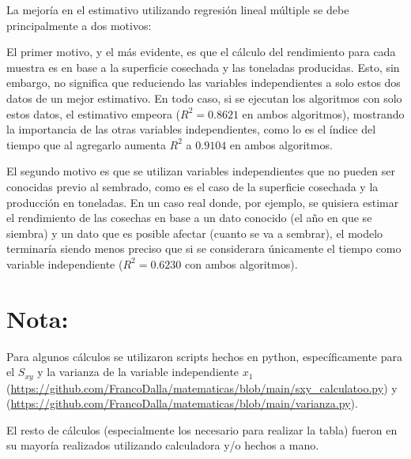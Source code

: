 \documentclass[spanish,12pt,a4paper]{article}
\begin{document}
\begin{enumerate}[label=\alph*)]
		La mejoría en el estimativo utilizando regresión lineal múltiple se debe principalmente a dos motivos:
		
		El primer motivo, y el más evidente, es que el cálculo del rendimiento para cada muestra es en base a la superficie cosechada y las toneladas producidas. Esto, sin embargo, no significa que reduciendo las variables independientes a solo estos dos datos de un mejor estimativo. En todo caso, si se ejecutan los algoritmos con solo estos datos, el estimativo empeora ($R^2=0.8621$ en ambos algoritmos), mostrando la importancia de las otras variables independientes, como lo es el índice del tiempo que al agregarlo aumenta $R^2$ a $0.9104$ en ambos algoritmos.
		
		El segundo motivo es que se utilizan variables independientes que no pueden ser conocidas previo al sembrado, como es el caso de la superficie cosechada y la producción en toneladas. En un caso real donde, por ejemplo, se quisiera estimar el rendimiento de las cosechas en base a un dato conocido (el año en que se siembra) y un dato que es posible afectar (cuanto se va a sembrar), el modelo terminaría siendo menos preciso que si se considerara únicamente el tiempo como variable independiente ($R^2 = 0.6230$ con ambos algoritmos).
	\end{enumerate}
	
	
	\section*{Nota:}
	Para algunos cálculos se utilizaron scripts hechos en python, específicamente para el $S_{xy}$ y la varianza de la variable independiente $x_1$ (\url{https://github.com/FrancoDalla/matematicas/blob/main/sxy_calculatoo.py}) y (\url{https://github.com/FrancoDalla/matematicas/blob/main/varianza.py}).
	
	El resto de cálculos (especialmente los necesario para realizar la tabla) fueron en su mayoría realizados utilizando calculadora y/o hechos a mano.
\end{document}
